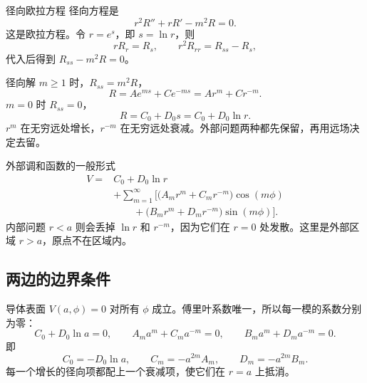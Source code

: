 \documentclass[fontset=windows, chinese, 10pt, xcolor=dvipsnames]{beamer}
\begin{document}
\begin{frame}{径向欧拉方程}
  径向方程是
  \begin{equation*}
    r^2 R''+r R'-m^2 R=0.
  \end{equation*}
  这是欧拉方程。令 $r=e^{s}$，即 $s=\ln r$，则
  \begin{equation*}
    r R_r=R_s,
    \qquad
    r^2 R_{rr}=R_{ss}-R_s,
  \end{equation*}
  代入后得到 $R_{ss}-m^2 R=0$。
\end{frame}

\begin{frame}{径向解}
  $m\geq 1$ 时，$R_{ss}=m^2 R$，
  \begin{equation*}
    R=A e^{ms}+C e^{-ms}=A r^{m}+C r^{-m}.
  \end{equation*}
  $m=0$ 时 $R_{ss}=0$，
  \begin{equation*}
    R=C_0+D_0 s=C_0+D_0\ln r.
  \end{equation*}
  $r^{m}$ 在无穷远处增长，$r^{-m}$ 在无穷远处衰减。外部问题两种都先保留，再用远场决定去留。
\end{frame}

\begin{frame}{外部调和函数的一般形式}
  \begin{equation*}
    \begin{aligned}
    V={}&C_0+D_0\ln r\\
    &+\sum_{m=1}^{\infty}\Big[
      \bigl(A_m r^{m}+C_m r^{-m}\bigr)\cos(m\phi)\\
      &\qquad
      +\bigl(B_m r^{m}+D_m r^{-m}\bigr)\sin(m\phi)
    \Big].
    \end{aligned}
  \end{equation*}
  内部问题 $r<a$ 则会丢掉 $\ln r$ 和 $r^{-m}$，因为它们在 $r=0$ 处发散。这里是外部区域 $r>a$，原点不在区域内。
\end{frame}

\subsection{两边的边界条件}

\begin{frame}{导体表面}
  $V(a,\phi)=0$ 对所有 $\phi$ 成立。傅里叶系数唯一，所以每一模的系数分别为零：
  \begin{equation*}
    C_0+D_0\ln a=0,
    \qquad
    A_m a^{m}+C_m a^{-m}=0,
    \qquad
    B_m a^{m}+D_m a^{-m}=0.
  \end{equation*}
  即
  \begin{equation*}
    C_0=-D_0\ln a,
    \qquad
    C_m=-a^{2m}A_m,
    \qquad
    D_m=-a^{2m}B_m.
  \end{equation*}
  每一个增长的径向项都配上一个衰减项，使它们在 $r=a$ 上抵消。
\end{frame}
\end{document}
